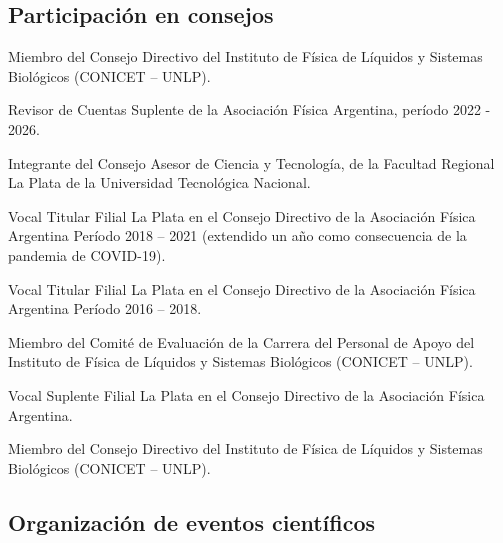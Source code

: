 \subsection{Participación en consejos }
\begin{timeline}
   Miembro del Consejo Directivo del Instituto de Física de Líquidos y Sistemas Biológicos (CONICET -- UNLP).

   Revisor de Cuentas Suplente de la Asociación Física Argentina, período 2022 - 2026.

   Integrante del Consejo Asesor de Ciencia y Tecnología, de la Facultad Regional La Plata de la Universidad Tecnológica Nacional.

   Vocal Titular Filial La Plata en el Consejo Directivo de la Asociación Física Argentina Período 2018 -- 2021 (extendido un año como consecuencia de la pandemia de COVID-19).

   Vocal Titular Filial La Plata en el Consejo Directivo de la Asociación Física Argentina Período 2016 -- 2018.

   Miembro del Comité de Evaluación de la Carrera del Personal de Apoyo del Instituto de Física de Líquidos y Sistemas Biológicos (CONICET -- UNLP).


   Vocal Suplente Filial La Plata en el Consejo Directivo de la Asociación Física Argentina.

   Miembro del Consejo Directivo del Instituto de Física de Líquidos y Sistemas Biológicos (CONICET -- UNLP).

\end{timeline}

\subsection{Organización de eventos científicos}

